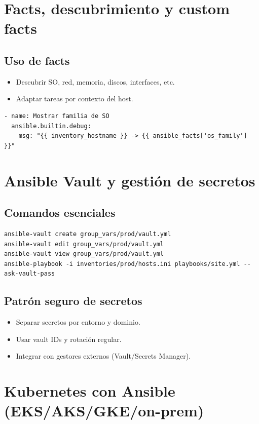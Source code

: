 \documentclass[12pt,a4paper]{article}
\begin{document}
\section{Facts, descubrimiento y custom facts}

\subsection{Uso de facts}
\begin{itemize}
  \item Descubrir SO, red, memoria, discos, interfaces, etc.
  \item Adaptar tareas por contexto del host.
\end{itemize}

\begin{lstlisting}[caption=Ejemplo con facts]
- name: Mostrar familia de SO
  ansible.builtin.debug:
    msg: "{{ inventory_hostname }} -> {{ ansible_facts['os_family'] }}"
\end{lstlisting}

\section{Ansible Vault y gestión de secretos}

\subsection{Comandos esenciales}
\begin{lstlisting}[caption=Vault básico]
ansible-vault create group_vars/prod/vault.yml
ansible-vault edit group_vars/prod/vault.yml
ansible-vault view group_vars/prod/vault.yml
ansible-playbook -i inventories/prod/hosts.ini playbooks/site.yml --ask-vault-pass
\end{lstlisting}

\subsection{Patrón seguro de secretos}
\begin{itemize}
  \item Separar secretos por entorno y dominio.
  \item Usar vault IDs y rotación regular.
  \item Integrar con gestores externos (Vault/Secrets Manager).
\end{itemize}

\section{Kubernetes con Ansible (EKS/AKS/GKE/on-prem)}
\end{document}
